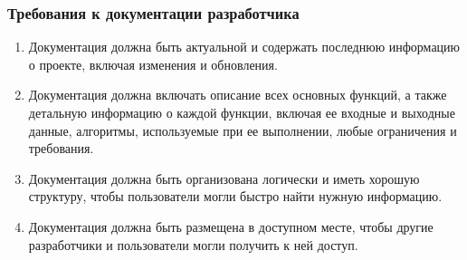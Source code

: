 \documentclass[14pt, a4paper]{extarticle}
\begin{document}
\subsubsection*{Требования к документации разработчика}

\begin{enumerate}
\item Документация должна быть актуальной и содержать последнюю информацию о проекте, включая изменения и обновления.
\item Документация должна включать описание всех основных функций, а также детальную информацию о каждой функции, включая ее входные и выходные данные, алгоритмы, используемые при ее выполнении, любые ограничения и требования.
\item Документация должна быть организована логически и иметь хорошую структуру, чтобы пользователи могли быстро найти нужную информацию.
\item Документация должна быть размещена в доступном месте, чтобы другие разработчики и пользователи могли получить к ней доступ.
\end{enumerate}
\end{document}
